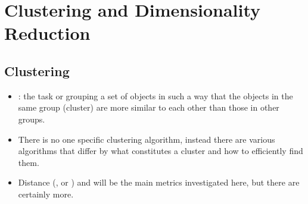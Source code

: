 \chapter{Clustering and Dimensionality Reduction}

\section{Clustering}
\begin{itemize}
  \item {}: the task or grouping a set of objects in such a way that the objects in the same group (cluster) are more similar to each other than those in other groups.
  \item There is no one specific clustering algorithm, instead there are various algorithms that differ by what constitutes a cluster and how to efficiently find them.
  \item Distance (\hyperref[Subsection: K-Means Clustering]{}, or \hyperref[Subsection: K-Nearest Neighbor]{}) and \hyperref[Subsection: DBSCAN]{} will be the main metrics investigated here, but there are certainly more.
  

\end{itemize}
